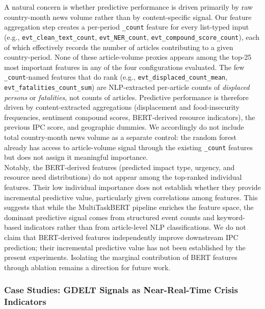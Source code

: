 \documentclass{article}
\begin{document}
A natural concern is whether predictive performance is driven primarily by raw country-month news volume rather than by content-specific signal. Our feature aggregation step creates a per-period \texttt{\_count} feature for every list-typed input (e.g., \texttt{evt\_clean\_text\_count}, \texttt{evt\_NER\_count}, \texttt{evt\_compound\_score\_count}), each of which effectively records the number of articles contributing to a given country-period. None of these article-volume proxies appears among the top-25 most important features in any of the four configurations evaluated. The few \texttt{\_count}-named features that do rank (e.g., \texttt{evt\_displaced\_count\_mean},  \\ \texttt{evt\_fatalities\_count\_sum}) are NLP-extracted per-article counts of \emph{displaced persons} or \emph{fatalities}, not counts of articles. Predictive performance is therefore driven by content-extracted aggregations (displacement and food-insecurity frequencies, sentiment compound scores, BERT-derived resource indicators), the previous IPC score, and geographic dummies. We accordingly do not include total country-month news volume as a separate control: the random forest already has access to article-volume signal through the existing \texttt{\_count} features but does not assign it meaningful importance. \\

Notably, the BERT-derived features (predicted impact type, urgency, and resource need distributions) do not appear among the top-ranked individual features. Their low individual importance does not establish whether they provide incremental predictive value, particularly given correlations among features. This suggests that while the MultiTaskBERT pipeline enriches the feature space, the dominant predictive signal comes from structured event counts and keyword-based indicators rather than from article-level NLP classifications. We do not claim that BERT-derived features independently improve downstream IPC prediction; their incremental predictive value has not been established by the present experiments. Isolating the marginal contribution of BERT features through ablation remains a direction for future work.

\subsubsection{Case Studies: GDELT Signals as Near-Real-Time Crisis Indicators}
\end{document}
